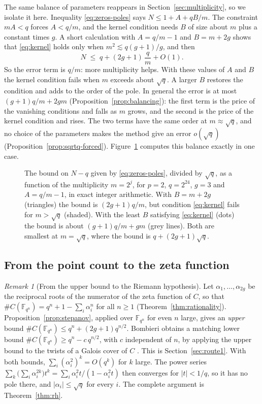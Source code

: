 \documentclass[11pt]{amsbook}
\theoremstyle{plain}
\theoremstyle{definition}
\theoremstyle{remark}
\newtheorem{remark}[theorem]{Remark}
\numberwithin{equation}{section}
\numberwithin{figure}{chapter}
\numberwithin{table}{chapter}
\newcommand{\F}{\mathbb{F}}
\begin{document}
The same balance of parameters reappears in
Section~\ref{sec:multiplicity}, so we isolate it here. Inequality
\eqref{eq:zeros-poles} says $N \le 1 + A + qB/m$. The constraint
$mA < q$ forces $A < q/m$, and the kernel condition needs $B$ of
size about $m$ plus a constant times $g$. A short calculation with
$A = q/m - 1$ and $B = m + 2g$ shows that \eqref{eq:kernel} holds
only when $m^2 \lesssim q(g+1)/g$, and then
\[
  N \;\le\; q + (2g + 1)\,\frac{q}{m} + O(1).
\]
So the error term is $q/m$: more multiplicity helps. With these
values of $A$ and $B$ the kernel condition fails when $m$ exceeds
about $\sqrt q$. A larger $B$ restores the condition and adds to
the order of the pole. In general the error is at most
$(g+1)q/m + 2gm$ (Proposition~\ref{prop:balancing}): the first
term is the price of the vanishing conditions and falls as $m$
grows, and the second is the price of the kernel condition and
rises. The two terms have the same order at $m \approx \sqrt q$,
and no choice of the parameters makes the method give an error
$o(\sqrt q)$ (Proposition~\ref{prop:sqrtq-forced}).
Figure~\ref{fig:stepanov-balance} computes this balance exactly in
one case.
\begin{figure}[tbp]
\centering
{}
\caption{The bound on $N-q$ given by \eqref{eq:zeros-poles}, divided
by $\sqrt q$, as a function of the multiplicity $m=2^j$, for $p=2$,
$q=2^{24}$, $g=3$ and $A=q/m-1$, in exact integer arithmetic. With
$B=m+2g$ (triangles) the bound is $(2g+1)q/m$, but condition
\eqref{eq:kernel} fails for $m>\sqrt q$ (shaded). With the least $B$
satisfying \eqref{eq:kernel} (dots) the bound is about
$(g+1)q/m+gm$ (grey lines). Both are smallest at $m=\sqrt q$, where
the bound is $q+(2g+1)\sqrt q$.}
\label{fig:stepanov-balance}
\end{figure}

\subsection*{From the point count to the zeta function}

\begin{remark}[From the upper bound to the Riemann hypothesis]
\label{rem:rh-curves}
Let $\alpha_1, \dots, \alpha_{2g}$ be the reciprocal roots of the
numerator of the zeta function of $C$, so that
$\#C(\F_{q^n}) = q^n + 1 - \sum_i \alpha_i^n$ for all $n \ge 1$
(Theorem~\ref{thm:rationality}). Proposition~\ref{prop:stepanov},
applied over $\F_{q^n}$ for even $n$ large, gives an \emph{upper}
bound $\#C(\F_{q^n}) \le q^n + (2g+1) q^{n/2}$. Bombieri obtains a
matching lower bound $\#C(\F_{q^n}) \ge q^n - c\,q^{n/2}$, with $c$
independent of $n$, by applying the upper bound to the twists of a
Galois cover of $C$ \cite{Bombieri1974}. This is
Section~\ref{sec:route1}. With both bounds,
$\sum_i (\alpha_i^2)^k = O(q^k)$ for $k$ large. The power series
$\sum_k \bigl(\sum_i \alpha_i^{2k}\bigr) t^k
= \sum_i \alpha_i^2 t / (1 - \alpha_i^2 t)$ then converges for
$|t| < 1/q$, so it has no pole there, and $|\alpha_i| \le \sqrt q$
for every $i$. The complete argument is Theorem~\ref{thm:rh}.
\end{remark}
\end{document}
